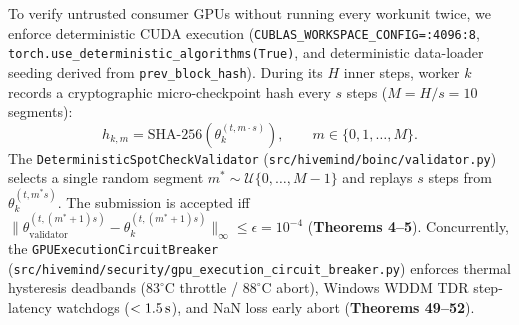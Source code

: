 \documentclass[11pt,a4paper]{article}
\begin{document}
To verify untrusted consumer GPUs without running every workunit twice, we enforce deterministic CUDA execution (\texttt{CUBLAS\_WORKSPACE\_CONFIG=:4096:8}, \texttt{torch.use\_deterministic\_algorithms(True)}, and deterministic data-loader seeding derived from \texttt{prev\_block\_hash}). During its $H$ inner steps, worker $k$ records a cryptographic micro-checkpoint hash every $s$ steps ($M = H/s = 10$ segments):
\begin{equation}
    h_{k, m} = \text{SHA-256}\!\left(\theta_k^{(t, m \cdot s)}\right), \qquad m \in \{0, 1, \dots, M\}.
\end{equation}
The \texttt{DeterministicSpotCheckValidator} (\texttt{src/hivemind/boinc/validator.py}) selects a single random segment $m^* \sim \mathcal{U}\{0, \dots, M-1\}$ and replays $s$ steps from $\theta_k^{(t, m^* s)}$. The submission is accepted iff $\|\theta_{\text{validator}}^{(t, (m^*+1)s)} - \theta_k^{(t, (m^*+1)s)}\|_\infty \le \epsilon = 10^{-4}$ (\textbf{Theorems 4--5}). Concurrently, the \texttt{GPUExecutionCircuitBreaker} (\texttt{src/hivemind/security/gpu\_execution\_circuit\_breaker.py}) enforces thermal hysteresis deadbands ($83^\circ\text{C}$ throttle / $88^\circ\text{C}$ abort), Windows WDDM TDR step-latency watchdogs ($<1.5\text{\,s}$), and NaN loss early abort (\textbf{Theorems 49--52}).
\end{document}
